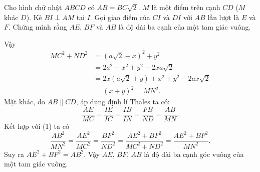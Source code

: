 \begin{bt}%
	Cho hình chữ nhật $ABCD$ có $AB=BC\sqrt{2}$. $M$ là một điểm trên cạnh $CD$ ($M$ khác $D$). Kẻ $BI \perp AM$ tại $I$. Gọi giao điểm của $CI$ và $DI$ với $AB$ lần lượt là $E$ và $F$. Chứng minh rằng $AE$, $BF$ và $AB$ là độ dài ba cạnh của một tam giác vuông.
	\loigiai
	{
		{}
		\noindent Vậy \begin{align*} MC^2+ND^2 & =\left(a\sqrt{2}-x\right)^2+y^2 \\ & = 2a^2+x^2+y^2-2xa\sqrt{2} \\ & = 2x\left(a\sqrt{2}+y\right)+x^2+y^2-2ax\sqrt{2} \\ & = (x+y)^2=MN^2.  \tag{1} \end{align*}
		Mặt khác, do $AB \parallel CD$, áp dụng định lí Thales ta có: $$\dfrac{AE}{MC}=\dfrac{IE}{IC}=\dfrac{IB}{IN}=\dfrac{FB}{ND}=\dfrac{AB}{MN}.$$
		Kết hợp với (1) ta có 
		$$\dfrac{AB^2}{MN^2}=\dfrac{AE^2}{MC^2}=\dfrac{BF^2}{ND^2}=\dfrac{AE^2+BF^2}{MC^2+ND^2}=\dfrac{AE^2+BF^2}{MN^2}.$$
		Suy ra $AE^2+BF^2=AB^2$. Vậy $AE$, $BF$, $AB$ là độ dài ba cạnh góc vuông của một tam giác vuông.}
\end{bt}

